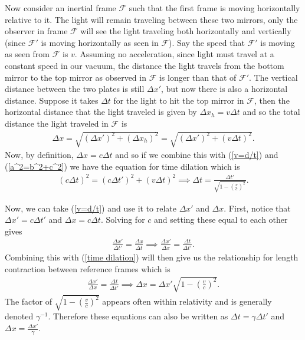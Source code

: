 Now consider an inertial frame $\mathcal{F}$ such that the first frame is moving horizontally relative to it. The light will remain traveling between these two mirrors, only the observer in frame $\mathcal{F}$ will see the light traveling both horizontally and vertically (since $\mathcal{F}'$ is moving horizontally as seen in $\mathcal{F}$). Say the speed that $\mathcal{F}'$ is moving as seen from $\mathcal{F}$ is $v$. Assuming no acceleration, since light must travel at a constant speed in our vacuum, the distance the light travels from the bottom mirror to the top mirror as observed in $\mathcal{F}$ is longer than that of $\mathcal{F}'$. The vertical distance between the two plates is still $\Delta x'$, but now there is also a horizontal distance. Suppose it takes $\Delta t$ for the light to hit the top mirror in $\mathcal{F}$, then the horizontal distance that the light traveled is given by $\Delta x_h = v \Delta t$ and so the total distance the light traveled in $\mathcal{F}$ is 
\begin{align}
	\Delta x =\sqrt{(\Delta x')^2 + (\Delta x_h)^2}=\sqrt{(\Delta x')^2 + (v \Delta t)^2}. \label{a^2=b^2+c^2}
\end{align}
Now, by definition, $\Delta x = c \Delta t$ and so if we combine this with (\ref{v=d/t}) and (\ref{a^2=b^2+c^2}) we have the equation for time dilation which is
\begin{align}
	(c \Delta t)^2=(c \Delta t')^2 + (v \Delta t)^2 \implies \boxed{\Delta t=\frac{\Delta t'}{\sqrt{1-\left(\frac{v}{c}\right)^2}}} \label{time dilation}.
\end{align}

Now, we can take (\ref{v=d/t}) and use it to relate $\Delta x'$ and $\Delta x$. First, notice that $\Delta x' = c \Delta t'$ and $\Delta x = c \Delta t$. Solving for $c$ and setting these equal to each other gives \begin{align}
	\frac{\Delta x'}{\Delta t'} = \frac{\Delta x}{\Delta t} \implies \frac{\Delta x'}{\Delta x} = \frac{\Delta t}{\Delta t'} \label{Delta x'/Delta t' = Delta x/Delta t}.
\end{align} 
Combining this with (\ref{time dilation}) will then give us the relationship for length contraction between reference frames which is
\begin{align}
	\frac{\Delta x'}{\Delta x} = \frac{\Delta t}{\Delta t'} \implies \Delta x = \boxed{\Delta x' \sqrt{1-\left(\frac{v}{c}\right)^2}}. \label{lengthContraction}
\end{align}
The factor of $\sqrt{1-\left(\frac{v}{c}\right)^2}$ appears often within relativity and is generally denoted $\gamma^{-1}$. Therefore these equations can also be written as $\Delta t=\gamma \Delta t'$ and $\Delta x=\frac{ \Delta x'}{\gamma}$. 

